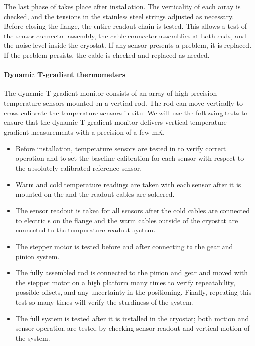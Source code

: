 The last phase of  takes place after installation. 
The verticality of each array %
is checked, and the tensions in the stainless steel strings adjusted as necessary.
Before closing the flange, the entire readout chain is %
tested.  
This allows a test of the sensor-connector assembly, the cable-connector assemblies at both ends, and the noise level inside the cryostat.
If any sensor presents a problem, it is replaced. If the problem persists, the cable is checked and replaced as needed.

\paragraph{Dynamic T-gradient thermometers}
\label{sec:fdgen-slow-cryo-qc-thdy}

The dynamic T-gradient monitor consists of an array of high-precision temperature sensors mounted on a vertical rod. The rod can move vertically to cross-calibrate the temperature sensors in situ. %
We will use the following %
tests to ensure that the dynamic T-gradient monitor delivers vertical temperature gradient measurements with a precision of a few \si{mK}.

\begin{itemize}
\item
Before installation, temperature sensors are tested in    to verify correct operation and to set the baseline calibration for each sensor with respect to the absolutely calibrated reference sensor. 
\item
Warm and cold temperature readings are taken with each sensor after it is mounted on the  and the readout cables are soldered. 
\item
The sensor readout is taken for all sensors after the cold cables are connected to electric \fdth{}s on the flange and the warm cables outside of the cryostat are connected to the temperature readout system.
\item 
The stepper motor is tested before and after connecting to the gear and pinion system.
\item
The fully assembled rod is connected to the pinion and gear and moved with the stepper motor on a high platform many times to verify repeatability, possible offsets, and any uncertainty in the positioning. Finally, repeating this test so many times will verify the sturdiness of the system.
\item
The full system is tested after it is installed in the cryostat; both motion and sensor operation are tested by checking %
sensor readout and vertical motion of the system.
\end{itemize} 

